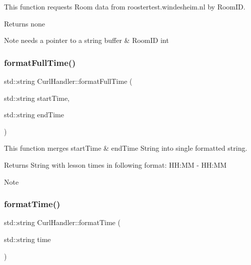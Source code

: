 This function requests Room data from roostertest.\+windesheim.\+nl by Room\+ID. 

\begin{DoxyReturn}{Returns}
none 
\end{DoxyReturn}
\begin{DoxyNote}{Note}
needs a pointer to a string buffer \& Room\+ID int 
\end{DoxyNote}
\mbox{\label{classCurlHandler_ae208efd8422979786ee921c5148b17c7}} 
\subsubsection{\texorpdfstring{format\+Full\+Time()}{formatFullTime()}}
{\footnotesize\ttfamily std\+::string Curl\+Handler\+::format\+Full\+Time (\begin{DoxyParamCaption}\item[{std\+::string}]{start\+Time,  }\item[{std\+::string}]{end\+Time }\end{DoxyParamCaption})}



This function merges start\+Time \& end\+Time String into single formatted string. 

\begin{DoxyReturn}{Returns}
String with lesson times in following format\+: HH\+:MM -\/ HH\+:MM 
\end{DoxyReturn}
\begin{DoxyNote}{Note}

\end{DoxyNote}
\mbox{\label{classCurlHandler_a8552fd1c4558661d3699e4cbd8897acc}} 
\subsubsection{\texorpdfstring{format\+Time()}{formatTime()}}
{\footnotesize\ttfamily std\+::string Curl\+Handler\+::format\+Time (\begin{DoxyParamCaption}\item[{std\+::string}]{time }\end{DoxyParamCaption})}




